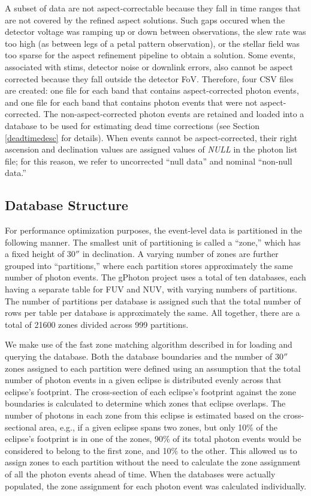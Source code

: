 \documentclass[preprint]{aastex}
\begin{document}
A subset of data are not aspect-correctable because they fall in time ranges that are not covered by the refined aspect solutions. Such gaps occured when the detector voltage was ramping up or down between observations, the slew rate was too high (as between legs of a petal pattern observation), or the stellar field was too sparse for the aspect refinement pipeline to obtain a solution. Some events, associated with stims, detector noise or downlink errors, also cannot be aspect corrected because they fall outside the detector FoV. Therefore, four CSV files are created: one file for each band that contains aspect-corrected photon events, and one file for each band that contains photon events that were not aspect-corrected. The non-aspect-corrected photon events are retained and loaded into a database to be used for estimating dead time corrections (see Section \ref{deadtimedesc} for details). When events cannot be aspect-corrected, their right ascension and declination values are assigned values of \emph{NULL} in the photon list file; for this reason, we refer to uncorrected ``null data'' and nominal ``non-null data.''

\subsection{Database Structure}
For performance optimization purposes, the event-level data is partitioned in the following manner.  The smallest unit of partitioning is called a ``zone,'' which has a fixed height of $30''$ in declination.  A varying number of zones are further grouped into ``partitions,'' where each partition stores approximately the same number of photon events. The gPhoton project uses a total of ten databases, each having a separate table for FUV and NUV, with varying numbers of partitions.  The number of partitions per database is assigned such that the total number of rows per table per database is approximately the same. All together, there are a total of 21600 zones divided across 999 partitions.

We make use of the fast zone matching algorithm described in \citet{gra2006} for loading and querying the database. Both the database boundaries and the number of $30''$ zones assigned to each partition were defined using an assumption that the total number of photon events in a given eclipse is distributed evenly across that eclipse's footprint. The cross-section of each eclipse's footprint against the zone boundaries is calculated to determine which zones that eclipse overlaps. The number of photons in each zone from this eclipse is estimated based on the cross-sectional area, e.g., if a given eclipse spans two zones, but only 10\% of the eclipse's footprint is in one of the zones, 90\% of its total photon events would be considered to belong to the first zone, and 10\% to the other. This allowed us to assign zones to each partition without the need to calculate the zone assignment of all the photon events ahead of time. When the databases were actually populated, the zone assignment for each photon event was calculated individually.
\end{document}
